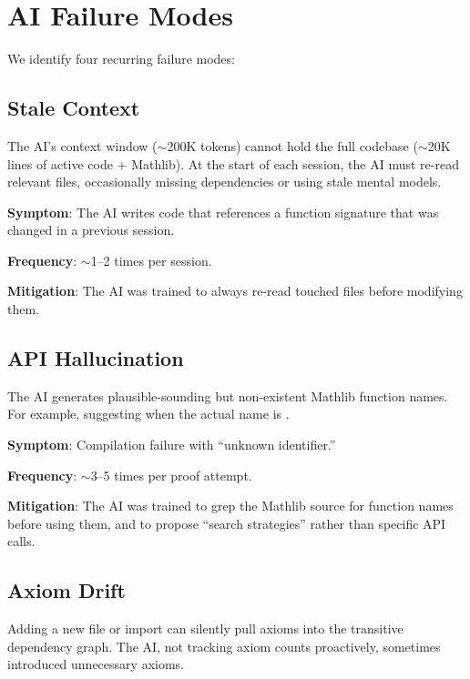 \documentclass[11pt,a4paper]{article}
\begin{document}
\section{AI Failure Modes}
\label{sec:failures}

We identify four recurring failure modes:

\subsection{Stale Context}

The AI's context window ($\sim$200K tokens) cannot hold the full
codebase ($\sim$20K lines of active code + Mathlib). At the start
of each session, the AI must re-read relevant files, occasionally
missing dependencies or using stale mental models.

\textbf{Symptom}: The AI writes code that references a function
signature that was changed in a previous session.

\textbf{Frequency}: $\sim$1--2 times per session.

\textbf{Mitigation}: The AI was trained to always re-read touched
files before modifying them.

\subsection{API Hallucination}

The AI generates plausible-sounding but non-existent Mathlib function
names. For example, suggesting 
when the actual name is .

\textbf{Symptom}: Compilation failure with ``unknown identifier.''

\textbf{Frequency}: $\sim$3--5 times per proof attempt.

\textbf{Mitigation}: The AI was trained to grep the Mathlib source
for function names before using them, and to propose ``search
strategies'' rather than specific API calls.

\subsection{Axiom Drift}

Adding a new file or import can silently pull axioms into the
transitive dependency graph. The AI, not tracking axiom counts
proactively, sometimes introduced unnecessary axioms.
\end{document}
